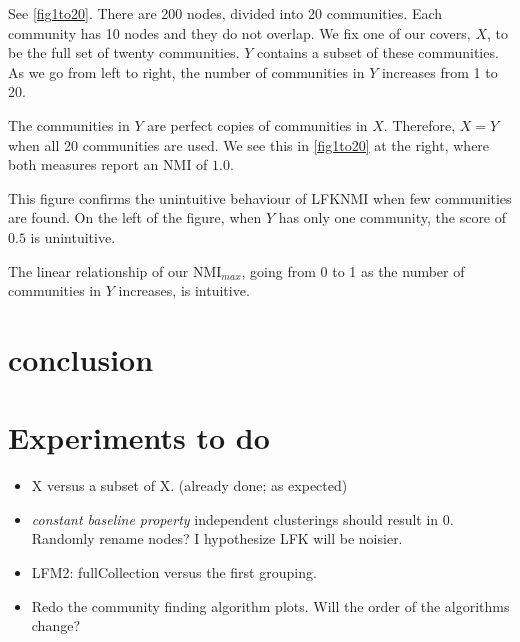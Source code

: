 \documentclass[9pt,technote]{IEEEtran}
\begin{document}
See \cref{fig1to20}. There are 200 nodes, divided into 20 communities. Each community has 10 nodes and they do not overlap.
We fix one of our covers, $X$, to be the full set of twenty communities. $Y$ contains a subset of these communities.
As we go from left to right, the number of communities in $Y$ increases from 1 to 20.

The communities in $Y$ are perfect copies of communities in $X$. Therefore, $X=Y$ when all 20 communities are used.
We see this in \cref{fig1to20} at the right, where both measures report an NMI of $1.0$.

This figure confirms the unintuitive behaviour of LFKNMI when few communities are found.
On the left of the figure, when $Y$ has only one community, the score of $0.5$ is unintuitive.

The linear relationship of our NMI$_{max}$, going from 0 to 1 as the number of communities in $Y$ increases, is intuitive.

\section{conclusion}







\section{Experiments to do}
\begin{itemize}
	\item X versus a subset of X. (already done; as expected)
	\item \emph{constant baseline property} independent clusterings should result in 0. Randomly rename nodes? I hypothesize LFK will be noisier.
	\item LFM2: fullCollection versus the first grouping.
	\item Redo the community finding algorithm plots. Will the order of the algorithms change?
\end{itemize}

%

%

\end{document}
